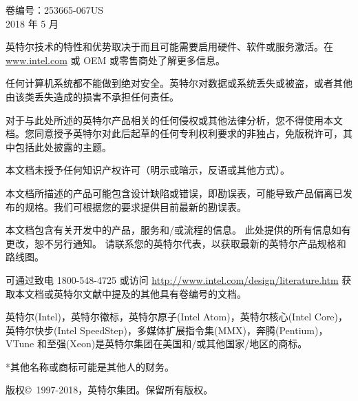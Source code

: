 \vspace{2cm}

\begin{flushright}
卷编号：253665-067US\\
2018 年 5 月
\end{flushright}

\newpage
\thispagestyle{empty}
\vspace*{12cm}
英特尔技术的特性和优势取决于而且可能需要启用硬件、软件或服务激活。在 \url{www.intel.com} 或 OEM 或零售商处了解更多信息。

任何计算机系统都不能做到绝对安全。英特尔对数据或系统丢失或被盗，或者其他由该类丢失造成的损害不承担任何责任。

对于与此处所述的英特尔产品相关的任何侵权或其他法律分析，您不得使用本文档。您同意授予英特尔对此后起草的任何专利权利要求的非独占，免版税许可，其中包括此处披露的主题。

本文档未授予任何知识产权许可（明示或暗示，反语或其他方式）。

本文档所描述的产品可能包含设计缺陷或错误，即勘误表，可能导致产品偏离已发布的规格。我们可根据您的要求提供目前最新的勘误表。

本文档包含有关开发中的产品，服务和/或流程的信息。 此处提供的所有信息如有更改，恕不另行通知。 请联系您的英特尔代表，以获取最新的英特尔产品规格和路线图。

可通过致电 1800-548-4725 或访问 \url{http://www.intel.com/design/literature.htm} 获取本文档或英特尔文献中提及的其他具有卷编号的文档。

英特尔(Intel)，英特尔徽标，英特尔原子(Intel Atom)，英特尔核心(Intel Core)，英特尔快步(Intel SpeedStep)，多媒体扩展指令集(MMX)，奔腾(Pentium)，VTune 和至强(Xeon)是英特尔集团在美国和/或其他国家/地区的商标。

*其他名称或商标可能是其他人的财务。

版权\copyright~1997-2018，英特尔集团。保留所有版权。